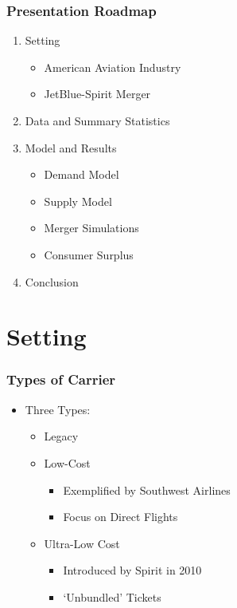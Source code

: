 \documentclass[xcolor=dvipsnames]{beamer}
\begin{document}
	\begin{frame}
		\frametitle{Presentation Roadmap}
		\begin{enumerate}
				\item Setting
				\begin{itemize}
					\item American Aviation Industry
					\item JetBlue-Spirit Merger
				\end{itemize}
				\item Data and Summary Statistics
				\item Model and Results 
				\begin{itemize}
					\item Demand Model
                    \item Supply Model
                    \item Merger Simulations
                    \item Consumer Surplus
				\end{itemize}
                \item Conclusion
			\end{enumerate}
	\end{frame}

    \section{Setting}
	\begin{frame}
		\frametitle{Types of Carrier}
		\begin{itemize}
			\item Three Types:
			\begin{itemize}
				\item Legacy %
				\item Low-Cost 
				\begin{itemize}
					\item Exemplified by Southwest Airlines
					\item Focus on Direct Flights
				\end{itemize}
				\item Ultra-Low Cost
				\begin{itemize}
					\item Introduced by Spirit in 2010
					\item `Unbundled' Tickets
				\end{itemize}
			\end{itemize}
		\end{itemize}
	\end{frame}
	
\end{document}
